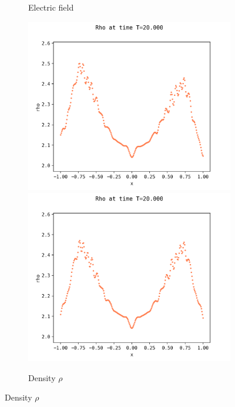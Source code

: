 \documentclass{article}
\numberwithin{equation}{section}
\newcommand{\mysubcaption}[1]{
	\vspace*{5pt}
	\begin{minipage}{0.8\linewidth}
		\begin{center}
			\footnotesize\emph{#1}
		\end{center}
	\end{minipage}
}
\newcommand{\imh}{\textheight} %
\newcommand{\imw}{\textwidth} %
\begin{document}
\begin{figure}
\begin{subfigure}{\textwidth}
		\caption{Electric field}
	\end{subfigure}
	\begin{subfigure}{\textwidth}
		\centering
		\includegraphics[height=\imh,width=\imw]{images/rhoT20_run5af.png}
		\includegraphics[height=\imh,width=\imw]{images/rhoT20_run5af_2.png}
		\caption{Density $\rho$}
	\end{subfigure}
	

\end{figure}
\end{document}
